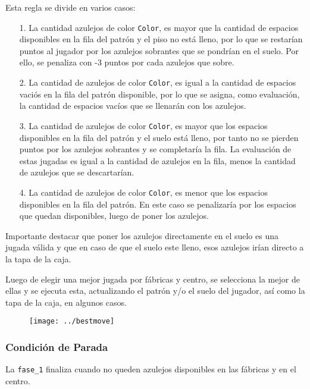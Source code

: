 \documentclass[12pt]{article}
\begin{document}
    Esta regla se divide en varios casos:
    \begin{itemize}
    	\item[1.] La cantidad azulejos de color \texttt{Color}, es mayor que la cantidad de espacios disponibles en la fila del patr\'on y el piso no est\'a lleno, por lo que se restar\'ian puntos al jugador por los azulejos sobrantes que se pondr\'ian en el suelo. Por ello, se penaliza con -3 puntos por cada azulejos que sobre.    	
    	\item[2.] La cantidad de azulejos de color \texttt{Color}, es igual a la cantidad de espacios vaci\'os en la fila del patr\'on disponible, por lo que se asigna, como evaluaci\'on, la cantidad de espacios vac\'ios que se llenar\'an con los azulejos.    	
    	\item [3.] La cantidad de azulejos de color \texttt{Color}, es mayor que los espacios disponibles en la fila del patr\'on y el suelo est\'a lleno, por tanto no se pierden puntos por los azulejos sobrantes y se completar\'ia la fila. La evaluaci\'on de estas jugadas es igual a la cantidad de azulejos en la fila, menos la cantidad de azulejos que se descartar\'ian.
    	\item [4.] La cantidad de azulejos de color \texttt{Color}, es menor que los espacios disponibles en la fila del patr\'on. En este caso se penalizar\'ia por los espacios que quedan disponibles, luego de poner los azulejos.   	

    \end{itemize}
    
  Importante destacar que poner los azulejos directamente en el suelo es una jugada v\'alida y que en caso de que el suelo este lleno, esos azulejos ir\'ian directo a la tapa de la caja.
  
  Luego de elegir una mejor jugada por f\'abricas y centro, se selecciona la mejor de ellas y se ejecuta esta, actualizando el patr\'on y/o el suelo del jugador, as\'i como la tapa de la caja, en algunos casos.
  
  \begin{figure}[h]
  	\begin{center}
  		\texttt{[image: ../bestmove]}  		
  	  	\end{center}
  \end{figure} 

\subsubsection*{Condici\'on de Parada}  
	La \texttt{fase\_1} finaliza cuando no queden azulejos disponibles en las f\'abricas y en el centro.
	
\end{document}
